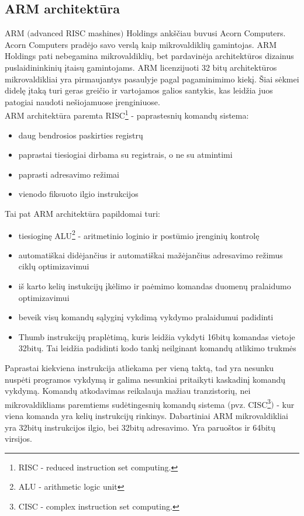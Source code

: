 \documentclass[a4paper, 12pt]{article} %
\begin{document}
\begin{onehalfspacing}
\newpage

\section{ARM architekt\={u}ra}
ARM $($advanced RISC mashines$)$ Holdings ank\v{s}\v{c}iau buvusi Acorn Computers. Acorn Computers prad\.{e}jo savo versl\k{a} kaip mikrovaldikli\k{u} gamintojas. ARM Holdings pati nebegamina mikrovaldikli\k{u}, bet pardavin\.{e}ja architekt\={u}ros dizainus puslaidininkini\k{u} \k{i}tais\k{u} gamintojams. ARM licenzijuoti 32 bit\k{u} architekt\={u}ros mikrovaldikliai yra pirmaujantys pasaulyje pagal pagaminimimo kiek\k{i}. \v{S}iai s\.{e}kmei didel\k{e} \k{i}tak\k{a} turi geras grei\v{c}io ir vartojamos galios santykis, kas leid\v{z}ia juos patogiai naudoti ne\v{s}iojamuose \k{i}renginiuose.    \\
\indent ARM architekt\={u}ra paremta RISC\footnote{RISC - reduced instruction set computing.} - paprastesni\k{u} komand\k{u} sistema:
\begin{itemize} 
\item daug bendrosios paskirties registr\k{u}
\item paprastai tiesiogiai dirbama su registrais, o ne su atmintimi
\item paprasti adresavimo re\v{z}imai
\item vienodo fiksuoto ilgio instrukcijos
\end{itemize} 
Tai pat ARM architekt\={u}ra papildomai turi:
\begin{itemize}
\item tiesiogin\k{e} ALU\footnote{ALU - arithmetic logic unit} - aritmetinio loginio ir post\={u}mio \k{i}rengini\k{u} kontrol\k{e}
\item automati\v{s}kai did\.{e}jan\v{c}ius ir automati\v{s}kai ma\v{z}\.{e}jan\v{c}ius adresavimo re\v{z}imus cikl\k{u} optimizavimui
\item i\v{s} karto keli\k{u} instukcij\k{u} \k{i}k\.elimo ir pa\.{e}mimo komandas duomen\k{u} pralaidumo optimizavimui
\item beveik vis\k{u} komand\k{u} s\k{a}lygin\k{i} vykdim\k{a} vykdymo pralaidumui padidinti
\item Thumb instrukcij\k{u} prapl\.{e}tim\k{a}, kuris leid\v{z}ia vykdyti 16bit\k{u} komandas vietoje 32bit\k{u}. Tai leid\v{z}ia padidinti kodo tank\k{i} neilginant komand\k{u} atlikimo trukm\.{e}s
\end{itemize}
Paprastai kiekviena instrukcija atliekama per vien\k{a} takt\k{a}, tad yra nesunku nusp\.{e}ti programos vykdym\k{a} ir galima nesunkiai pritaikyti kaskadin\k{i} komand\k{u} vykdym\k{a}. Komand\k{u} atkodavimas reikalauja ma\v{z}iau tranzistori\k{u}, nei mikrovaldikliams paremtiems sud\.{e}tingesni\k{u} komand\k{u} sistema $($pvz. CISC\footnote{CISC - complex instruction set computing.}$)$ - kur viena komanda yra keli\k{u} instrukcij\k{u} rinkinys. Dabartiniai ARM mikrovaldikliai yra 32bit\k{u} instrukcijos ilgio, bei 32bit\k{u} adresavimo. Yra paruo\v{s}tos ir 64bit\k{u} virsijos. \\

\end{onehalfspacing}
\end{document}
